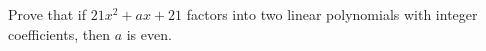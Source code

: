 Prove that if $21x^2+ax+21$ factors into two linear polynomials with integer coefficients, then $a$ is even.
